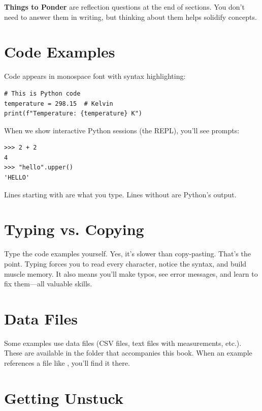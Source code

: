 \begin{ponder}
\textbf{Things to Ponder} are reflection questions at the end of sections. You don't need to answer them in writing, but thinking about them helps solidify concepts.
\end{ponder}

\section*{Code Examples}

Code appears in monospace font with syntax highlighting:

\begin{lstlisting}
# This is Python code
temperature = 298.15  # Kelvin
print(f"Temperature: {temperature} K")
\end{lstlisting}

When we show interactive Python sessions (the REPL), you'll see \py{>>>} prompts:

\begin{lstlisting}
>>> 2 + 2
4
>>> "hello".upper()
'HELLO'
\end{lstlisting}

Lines starting with \py{>>>} are what you type. Lines without are Python's output.

\section*{Typing vs. Copying}

Type the code examples yourself. Yes, it's slower than copy-pasting. That's the point. Typing forces you to read every character, notice the syntax, and build muscle memory. It also means you'll make typos, see error messages, and learn to fix them---all valuable skills.

\section*{Data Files}

Some examples use data files (CSV files, text files with measurements, etc.). These are available in the  folder that accompanies this book. When an example references a file like , you'll find it there.

\section*{Getting Unstuck}

